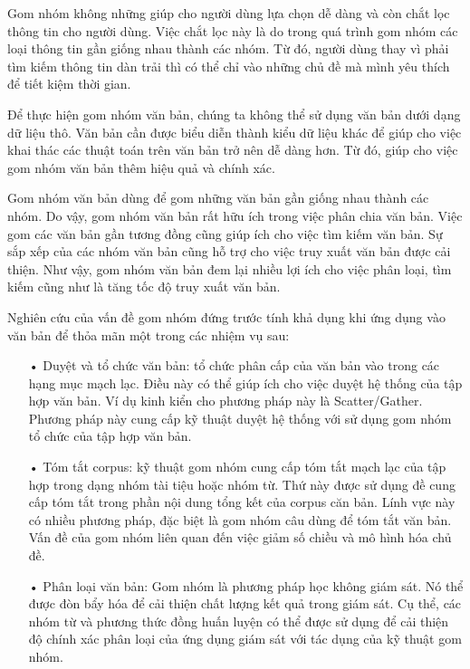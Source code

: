 Gom nhóm không những giúp cho người dùng lựa chọn dễ dàng và còn chắt lọc thông tin cho người dùng.
Việc chắt lọc này là do trong quá trình gom nhóm các loại thông tin gần giống nhau thành các nhóm.
Từ đó, người dùng thay vì phải tìm kiếm thông tin dàn trải thì có thể chỉ vào những chủ đề mà mình yêu thích để tiết kiệm thời gian.

Để thực hiện gom nhóm văn bản, chúng ta không thể sử dụng văn bản dưới dạng dữ liệu thô.
Văn bản cần được biểu diễn thành kiểu dữ liệu khác để giúp cho việc khai thác các thuật toán trên văn bản trở nên dễ dàng hơn.
Từ đó, giúp cho việc gom nhóm văn bản thêm hiệu quả và chính xác.


Gom nhóm văn bản dùng để gom những văn bản gần giống nhau thành các nhóm. 
Do vậy, gom nhóm văn bản rất hữu ích trong việc phân chia văn bản.
Việc gom các văn bản gần tương đồng cũng giúp ích cho việc tìm kiếm văn bản.
Sự sắp xếp của các nhóm văn bản cũng hỗ trợ cho việc truy xuất văn bản được cải thiện.
Như vậy, gom nhóm văn bản đem lại nhiều lợi ích cho việc phân loại, tìm kiếm cũng như là tăng tốc độ truy xuất văn bản.


Nghiên cứu của vấn đề gom nhóm đứng trước tính khả dụng khi ứng dụng vào văn bản để thỏa mãn một trong các nhiệm vụ sau:
\begin{enumerate}
\item[•]Duyệt và tổ chức văn bản: tổ chức phân cấp của văn bản vào trong các hạng mục mạch lạc.
Điều này có thể giúp ích cho việc duyệt hệ thống của tập hợp văn bản.
Ví dụ kinh kiển cho phương pháp này là Scatter/Gather.
Phương pháp này cung cấp kỹ thuật duyệt hệ thống với sử dụng gom nhóm tổ chức của tập hợp văn bản.
\item[•]Tóm tắt corpus: kỹ thuật gom nhóm cung cấp tóm tắt mạch lạc của tập hợp trong dạng nhóm tài tiệu hoặc nhóm từ.
Thứ này được sử dụng đề cung cấp tóm tắt trong phần nội dung tổng kết của corpus căn bản.
Lính vực này có nhiều phương pháp, đặc biệt là gom nhóm câu dùng để tóm tắt văn bản.
Vấn đề của gom nhóm liên quan đến việc giảm số chiều và mô hình hóa chủ đề. 
\item[•]Phân loại văn bản: Gom nhóm là phương pháp học không giám sát.
Nó thể được đòn bẩy hóa để cải thiện chất lượng kết quả trong giám sát.
Cụ thể, các nhóm từ và phương thức đồng huấn luyện có thể được sử dụng để cải thiện độ chính xác phân loại của ứng dụng giám sát với tác dụng của kỹ thuật gom nhóm.
\end{enumerate}

